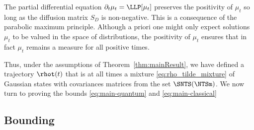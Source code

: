 \documentclass{article}
\numberwithin{equation}{section}
\begin{document}
The partial differential equation $\partial_t \mu_t = \LLP[\mu_t]$ preserves the positivity of $\mu_t$ so long as the diffusion matrix $S_D$ is non-negative.  This is a consequence of the parabolic maximum principle.  Although a priori one might only expect solutions $\mu_t$ to be valued in the space of distributions, the positivity of $\mu_t$ ensures that in fact $\mu_t$ remains a measure for all positive times.

Thus, under the assumptions of Theorem~\ref{thm:mainResult}, we have defined a trajectory $\rhot(t)$ that is at all times a mixture \eqref{eq:rho_tilde_mixture} of Gaussian states with covariances matrices from the set $\SNTS(\NTSm)$.  We now turn to proving the 
bounds \eqref{eq:main-quantum} and \eqref{eq:main-classical}

\subsection{Bounding }\label{sec:quantum-duhamel}
\end{document}
